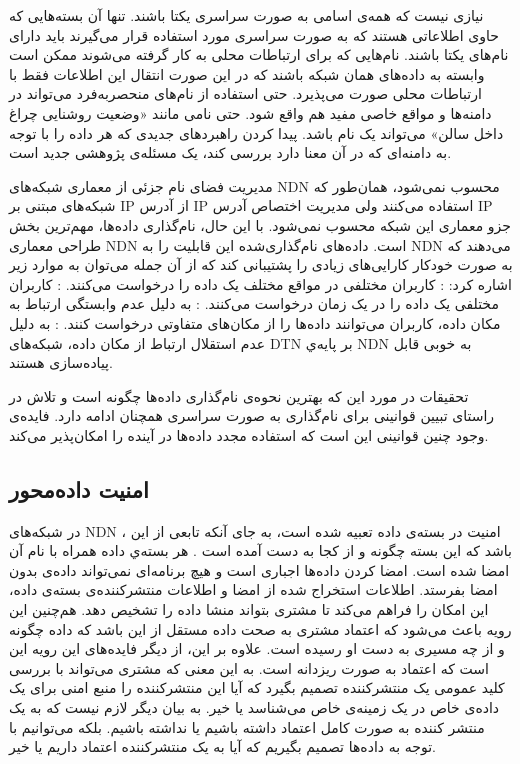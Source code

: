 نیازی نیست که همه‌ی اسامی به صورت سراسری یکتا باشند. تنها آن بسته‌هایی که حاوی اطلاعاتی هستند که به صورت سراسری مورد استفاده قرار می‌گیرند باید دارای نام‌های یکتا باشند. نام‌‌هایی که برای ارتباطات محلی به کار گرفته می‌شوند ممکن است وابسته به داده‌های همان شبکه باشند که در این صورت انتقال این اطلاعات فقط با ارتباطات محلی صورت می‌پذیرد. حتی استفاده از نام‌های منحصربه‌فرد می‌تواند در دامنه‌ها و مواقع خاصی مفید هم واقع شود. حتی نامی مانند «وضعیت روشنایی چراغ داخل سالن» می‌تواند یک نام باشد. پیدا کردن راهبردهای جدیدی که هر داده را با توجه به دامنه‌ای که در ‌آن معنا دارد بررسی کند، یک مسئله‌ی پژوهشی جدید است. 

مدیریت فضای نام جزئی از معماری شبکه‌های NDN  محسوب نمی‌شود، همان‌طور که شبکه‌های مبتنی بر IP از آدرس IP استفاده می‌کنند ولی مدیریت اختصاص آدرس IP جزو معماری این شبکه محسوب نمی‌شود. با این حال، نام‌گذاری داده‌‌ها، مهم‌ترین بخش طراحی معماری NDN است. داده‌های نام‌گذاری‌شده این قابلیت را به NDN می‌دهند که به صورت خودکار کارایی‌های زیادی را پشتیبانی کند که از آن جمله می‌توان به موارد زیر اشاره کرد:
 : کاربران مختلفی در مواقع مختلف یک داده را درخواست می‌کنند. 
 : کاربران مختلفی یک داده را در یک زمان درخواست می‌کنند.
 :‌  به دلیل عدم وابستگی ارتباط به مکان داده، کاربران می‌توانند داده‌ها را از مکان‌های متفاوتی درخواست کنند. 
 : به دلیل عدم استقلال ارتباط از مکان داده، شبکه‌های DTN بر پایه‌ي NDN به خوبی قابل پیاده‌سازی هستند. 

تحقیقات در مورد این که بهترین نحوه‌ی نام‌گذاری داده‌ها چگونه است و تلاش در راستای تبیین قوانینی برای نام‌گذاری به صورت سراسری همچنان ادامه دارد. فایده‌ی وجود چنین قوانینی این است که استفاده مجدد داده‌ها در آینده را امکان‌پذیر می‌کند.  
\subsection{امنیت داده‌محور}
در شبکه‌های ‌NDN ، امنیت در بسته‌ی داده تعبیه شده است، به جای آنکه تابعی از این باشد که این بسته چگونه و از کجا به دست آمده است 
\cite{nnt}.
هر بسته‌ي داده همراه با نام آن امضا شده است. امضا کردن داده‌‌ها اجباری است و هیچ برنامه‌ای نمی‌تواند داده‌ی بدون امضا بفرستد. اطلاعات استخراج شده از امضا و اطلاعات منتشرکننده‌ی بسته‌ی داده، این امکان را فراهم می‌کند تا مشتری بتواند منشا داده را تشخیص دهد. هم‌چنین این رویه باعث می‌شود که  اعتماد مشتری به صحت داده مستقل از این باشد که داده چگونه و از چه مسیری به دست او رسیده است. علاوه بر این، از دیگر فایده‌های این رویه این است که اعتماد به صورت ریزدانه است. به این معنی که مشتری می‌تواند با بررسی کلید عمومی یک منتشرکننده تصمیم بگیرد که آیا این منتشرکننده را منبع امنی برای یک داده‌ی خاص در یک زمینه‌ی خاص می‌شناسد یا خیر. به بیان دیگر لازم نیست که به یک منتشر کننده به صورت کامل اعتماد داشته باشیم یا نداشته باشیم. بلکه می‌توانیم با توجه به داده‌ها تصمیم بگیریم که آیا به یک منتشرکننده اعتماد داریم یا خیر. 

